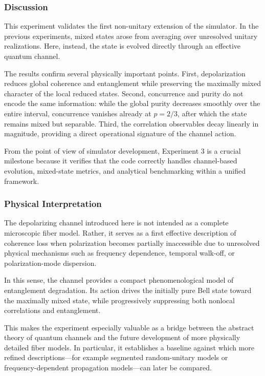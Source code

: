 \documentclass[a4paper]{article}
\begin{document}
\subsubsection{Discussion}

This experiment validates the first non-unitary extension of the simulator. In the previous experiments, mixed states arose from averaging over unresolved unitary realizations. Here, instead, the state is evolved directly through an effective quantum channel.

The results confirm several physically important points. First, depolarization reduces global coherence and entanglement while preserving the maximally mixed character of the local reduced states. Second, concurrence and purity do not encode the same information: while the global purity decreases smoothly over the entire interval, concurrence vanishes already at \(p=2/3\), after which the state remains mixed but separable. Third, the correlation observables decay linearly in magnitude, providing a direct operational signature of the channel action.

From the point of view of simulator development, Experiment 3 is a crucial milestone because it verifies that the code correctly handles channel-based evolution, mixed-state metrics, and analytical benchmarking within a unified framework.

\subsubsection{Physical Interpretation}

The depolarizing channel introduced here is not intended as a complete microscopic fiber model. Rather, it serves as a first effective description of coherence loss when polarization becomes partially inaccessible due to unresolved physical mechanisms such as frequency dependence, temporal walk-off, or polarization-mode dispersion.

In this sense, the channel provides a compact phenomenological model of entanglement degradation. Its action drives the initially pure Bell state toward the maximally mixed state, while progressively suppressing both nonlocal correlations and entanglement.

This makes the experiment especially valuable as a bridge between the abstract theory of quantum channels and the future development of more physically detailed fiber models. In particular, it establishes a baseline against which more refined descriptions---for example segmented random-unitary models or frequency-dependent propagation models---can later be compared.
\end{document}
